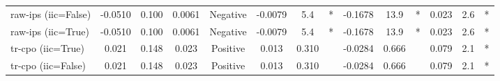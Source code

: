 \begin{table}[htbp]
\begin{tabular}{l|ccccccccccccc}
raw-ips (iic=False) & -0.0510 & 0.100 & 0.0061 & Negative & -0.0079 & 5.4 & * & -0.1678 & 13.9 & * & 0.023 & 2.6 & * \\
raw-ips (iic=True) & -0.0510 & 0.100 & 0.0061 & Negative & -0.0079 & 5.4 & * & -0.1678 & 13.9 & * & 0.023 & 2.6 & * \\
tr-cpo (iic=True) & 0.021 & 0.148 & 0.023 & Positive & 0.013 & 0.310 &  & -0.0284 & 0.666 &  & 0.079 & 2.1 & * \\
tr-cpo (iic=False) & 0.021 & 0.148 & 0.023 & Positive & 0.013 & 0.310 &  & -0.0284 & 0.666 &  & 0.079 & 2.1 & * \\
\bottomrule
\end{tabular}
\end{table}